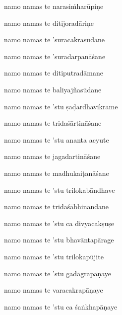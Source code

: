 \ujvers\nemsloka 
namo namas te narasi\.mharūpiṇe
\dontdisplaylinenum

\nemslokab 
namo namas te ditijoradāriṇe \danda\dontdisplaylinenum

\nemslokac 
namo namas te 'suracakrasūdane
\dontdisplaylinenum

\nemslokad 
namo namas te 'suradarpanāśane \veg\dontdisplaylinenum

\ujvers\nemsloka 
namo namas te ditiputradāmane
\dontdisplaylinenum

\nemslokab 
namo namas te baliyajñasūdane \danda\dontdisplaylinenum

\nemslokac 
namo namas te 'stu ṣaḍardhavikrame
\dontdisplaylinenum

\nemslokad 
namo namas te tridaśārtināśane \veg\dontdisplaylinenum

\ujvers\nemsloka 
namo namas te 'stu ananta acyute
\dontdisplaylinenum

\nemslokab 
namo namas te jagadartināśane \danda\dontdisplaylinenum

\nemslokac 
namo namas te madhukaiṭanāśane
\dontdisplaylinenum

\nemslokad 
namo namas te 'stu trilokabāndhave \veg\dontdisplaylinenum

\ujvers\nemsloka 
namo namas te tridaśābhinandane
\dontdisplaylinenum

\nemslokab 
namo namas te 'stu ca divyacakṣuṣe \danda\dontdisplaylinenum

\nemslokac 
namo namas te 'stu bhavāntapārage
\dontdisplaylinenum

\nemslokad 
namo namas te 'stu trilokapūjite \veg\dontdisplaylinenum

\ujvers\nemsloka 
namo namas te 'stu gadāgrapāṇaye
\dontdisplaylinenum

\nemslokab 
namo namas te varacakrapāṇaye \danda\dontdisplaylinenum

\nemslokac 
namo namas te 'stu ca śaṅkhapāṇaye
\dontdisplaylinenum

